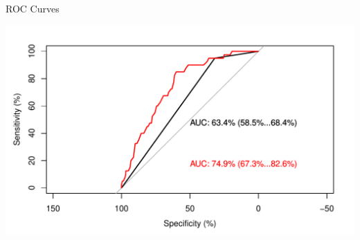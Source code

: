 \documentclass[10pt,handout]{beamer}\usepackage[]{graphicx}\usepackage[]{color}
\makeatletter
\def\maxwidth{ %
  \ifdim\Gin@nat@width>\linewidth
    \linewidth
  \else
    \Gin@nat@width
  \fi
}
\newenvironment{knitrout}{}{} %
\makeatother
\begin{document}
\begin{frame}[fragile]{ROC Curves}
\begin{knitrout}\tiny
{}\color{fgcolor}

{\centering \includegraphics[width=\maxwidth]{figure/unnamed-chunk-50-1} 

}


\end{knitrout}
\end{frame}
\end{document}
